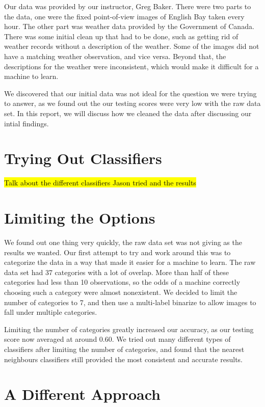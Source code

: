 Our data was provided by our instructor, Greg Baker. There were two parts to the data, one were the fixed point-of-view images of English Bay taken every hour. The other part was weather data provided by the Government of Canada. There was some initial clean up that had to be done, such as getting rid of weather records without a description of the weather. Some of the images did not have a matching weather observation, and vice versa. Beyond that, the descriptions for the weather were inconsistent, which would make it difficult for a machine to learn.

We discovered that our initial data was not ideal for the question we were trying to answer, as we found out the our testing scores were very low with the raw data set. In this report, we will discuss how we cleaned the data after discussing our intial findings.

\section{Trying Out Classifiers}

\hl{Talk about the different classifiers Jason tried and the results}

\section{Limiting the Options}

We found out one thing very quickly, the raw data set was not giving as the results we wanted. Our first attempt to try and work around this was to categorize the data in a way that made it easier for a machine to learn. The raw data set had 37 categories with a lot of overlap. More than half of these categories had less than 10 observations, so the odds of a machine correctly choosing such a category were almost nonexistent. We decided to limit the number of categories to 7, and then use a multi-label binarize to allow images to fall under multiple categories.

Limiting the number of categories greatly increased our accuracy, as our testing score now averaged at around 0.60. We tried out many different types of classifiers after limiting the number of categories, and found that the nearest neighbours classifiers still provided the most consistent and accurate results.

\section{A Different Approach}

